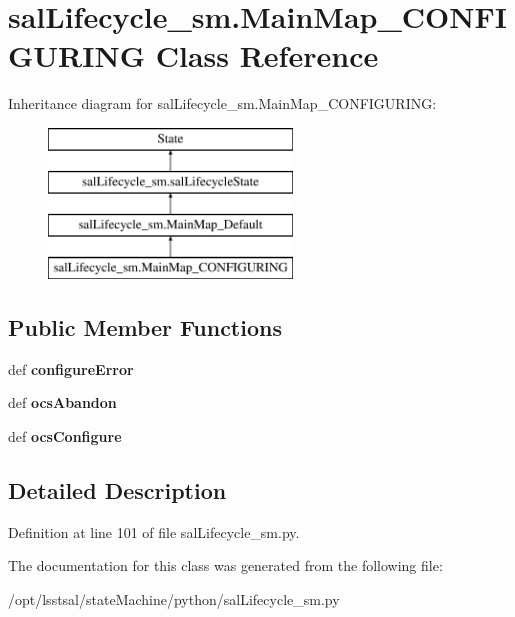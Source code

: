 \hypertarget{classsal_lifecycle__sm_1_1_main_map___c_o_n_f_i_g_u_r_i_n_g}{\section{sal\-Lifecycle\-\_\-sm.\-Main\-Map\-\_\-\-C\-O\-N\-F\-I\-G\-U\-R\-I\-N\-G Class Reference}
\label{classsal_lifecycle__sm_1_1_main_map___c_o_n_f_i_g_u_r_i_n_g}
}
Inheritance diagram for sal\-Lifecycle\-\_\-sm.\-Main\-Map\-\_\-\-C\-O\-N\-F\-I\-G\-U\-R\-I\-N\-G\-:\begin{figure}[H]
\begin{center}
\leavevmode
\includegraphics[height=4.000000cm]{classsal_lifecycle__sm_1_1_main_map___c_o_n_f_i_g_u_r_i_n_g}
\end{center}
\end{figure}
\subsection*{Public Member Functions}
\begin{DoxyCompactItemize}
\item 
\hypertarget{classsal_lifecycle__sm_1_1_main_map___c_o_n_f_i_g_u_r_i_n_g_a2c13841d2bc1e4791b75bf3c93638d8d}{def {\bfseries configure\-Error}}\label{classsal_lifecycle__sm_1_1_main_map___c_o_n_f_i_g_u_r_i_n_g_a2c13841d2bc1e4791b75bf3c93638d8d}

\item 
\hypertarget{classsal_lifecycle__sm_1_1_main_map___c_o_n_f_i_g_u_r_i_n_g_a8e52976b6a56f8282c415c89e9e1d940}{def {\bfseries ocs\-Abandon}}\label{classsal_lifecycle__sm_1_1_main_map___c_o_n_f_i_g_u_r_i_n_g_a8e52976b6a56f8282c415c89e9e1d940}

\item 
\hypertarget{classsal_lifecycle__sm_1_1_main_map___c_o_n_f_i_g_u_r_i_n_g_af61b61dd4536f1cec2c89a2b59263efa}{def {\bfseries ocs\-Configure}}\label{classsal_lifecycle__sm_1_1_main_map___c_o_n_f_i_g_u_r_i_n_g_af61b61dd4536f1cec2c89a2b59263efa}

\end{DoxyCompactItemize}


\subsection{Detailed Description}


Definition at line 101 of file sal\-Lifecycle\-\_\-sm.\-py.



The documentation for this class was generated from the following file\-:\begin{DoxyCompactItemize}
\item 
/opt/lsstsal/state\-Machine/python/sal\-Lifecycle\-\_\-sm.\-py\end{DoxyCompactItemize}
